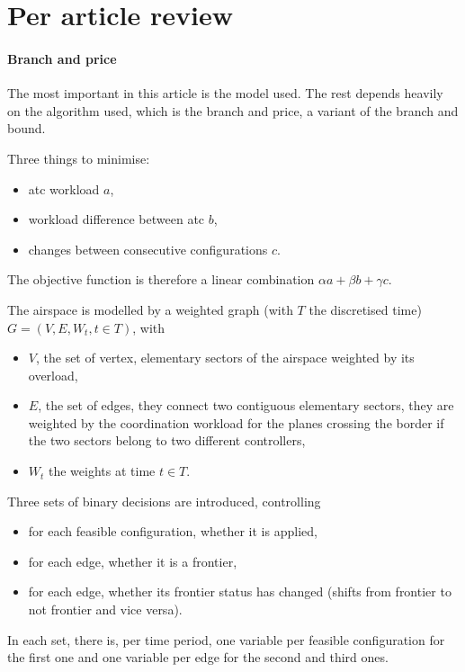 \documentclass{article}
\begin{document}
\section{Per article review}
\paragraph{Branch and price~\cite{treimuth2016branch}}
The most important in this article is the model used. The rest depends heavily
on the algorithm used, which is the branch and price, a variant of the branch
and bound.

Three things to minimise:
\begin{itemize}
  \item atc workload \(a\),
  \item workload difference between atc \(b\),
  \item changes between consecutive configurations \(c\).
\end{itemize}
The objective function is therefore a linear combination \(\alpha a + \beta b +
\gamma c\).

The airspace is modelled by a weighted graph (with \(T\) the discretised time)
\(G = (V, E, W_t, t\in T)\), with
\begin{itemize}
  \item \(V\), the set of vertex, elementary sectors of the airspace weighted by
    its overload,
  \item \(E\), the set of edges, they connect two contiguous elementary sectors,
    they are weighted by the coordination workload for the planes crossing the
    border if the two sectors belong to two different controllers,
  \item \(W_t\) the weights at time \(t\in T\).
\end{itemize}


Three sets of binary decisions are introduced, controlling
\begin{itemize}
  \item for each feasible configuration, whether it is applied,
  \item for each edge, whether it is a frontier,
  \item for each edge, whether its frontier status has changed (shifts from
    frontier to not frontier and vice versa).
\end{itemize}
In each set, there is, per time period, one variable per feasible configuration
for the first one and one variable per edge for the second and third ones.
\end{document}
